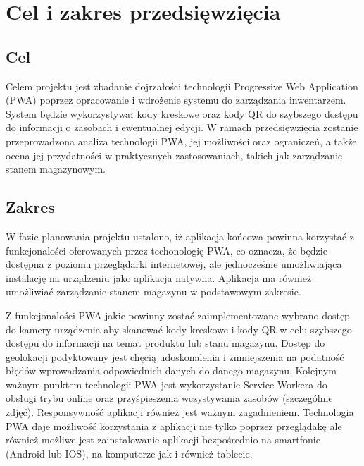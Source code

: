 \documentclass[../main.tex]{subfiles}
\begin{document}
\section{Cel i zakres przedsięwzięcia}
    \subsection{Cel}    
    Celem projektu jest zbadanie dojrzałości technologii Progressive Web Application (PWA) poprzez opracowanie i wdrożenie systemu do zarządzania inwentarzem. System będzie wykorzystywał kody kreskowe oraz kody QR do szybszego dostępu do informacji o zasobach i ewentualnej edycji. W ramach przedsięwzięcia zostanie przeprowadzona analiza technologii PWA, jej możliwości oraz ograniczeń, a także ocena jej przydatności w praktycznych zastosowaniach, takich jak zarządzanie stanem magazynowym.
        

    \subsection{Zakres}
        W fazie planowania projektu ustalono, iż aplikacja końcowa powinna korzystać z funkcjonalości oferowanych przez techonologię PWA, co oznacza, że będzie dostępna z poziomu przeglądarki internetowej, ale jednocześnie umożliwiająca instalację na urządzeniu jako aplikacja natywna. Aplikacja ma również umożliwiać zarządzanie stanem magazynu w podstawowym zakresie. 

        Z funkcjonalości PWA jakie powinny zostać zaimplementowane wybrano dostęp do kamery urządzenia aby skanować kody kreskowe i kody QR w celu szybszego dostępu do informacji na temat produktu lub stanu magazynu. Dostęp do geolokacji podyktowany jest chęcią udoskonalenia i zmniejszenia na podatność błędów wprowadzania odpowiednich danych do danego magazynu. Kolejnym ważnym punktem technologii PWA jest wykorzystanie Service Workera do obsługi trybu online oraz przyśpieszenia wczystywania zasobów (szczególnie zdjęć). Responsywność aplikacji również jest ważnym zagadnieniem. Technologia PWA daje możliwość korzystania z aplikacji nie tylko poprzez przeglądakę ale również możliwe jest zainstalowanie aplikacji bezpośrednio na smartfonie (Android lub IOS), na komputerze jak i również tablecie. 
\end{document}
